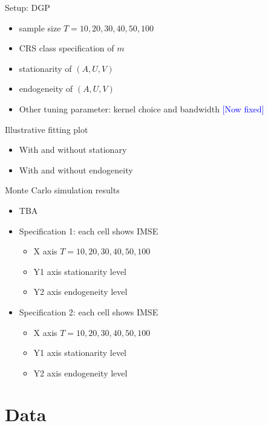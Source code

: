 \documentclass[aspectratio=169]{beamer}
\begin{document}
\begin{frame}{Setup: DGP}
\begin{itemize}
    \item sample size $T=10,20,30,40,50,100$
    \item CRS class specification of $m$
    \item stationarity of $(A,U,V)$
    \item endogeneity of $(A,U,V)$
    \item Other tuning parameter: kernel choice and bandwidth  \textcolor{blue}{[Now fixed]}
\end{itemize}
    
\end{frame}

\begin{frame}{Illustrative fitting plot}
\begin{itemize}
    \item With and without stationary
    \item With and without endogeneity
\end{itemize}
    
\end{frame}

\begin{frame}{Monte Carlo simulation results}
\begin{itemize}
    \item TBA
    \item Specification 1: each cell shows IMSE
    \begin{itemize}
        \item X axis $T=10,20,30,40,50,100$ 
        \item Y1 axis stationarity level
        \item Y2 axis endogeneity level
    \end{itemize}
    \item Specification 2: each cell shows IMSE
    \begin{itemize}
        \item X axis $T=10,20,30,40,50,100$ 
        \item Y1 axis stationarity level
        \item Y2 axis endogeneity level
    \end{itemize}
    
\end{itemize}
    
\end{frame}


\section{Data}
\end{document}
